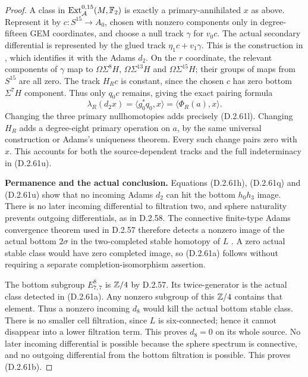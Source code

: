 \begin{proof}
A class in $\operatorname{Ext}^{0,15}_{\mathcal A}(M,\mathbb F_2)$
is exactly a primary-annihilated $x$ as above.
Represent it by $c:S^{15}\to A_0$, chosen with nonzero
components only in degree-fifteen GEM coordinates, and
choose a null track $\gamma$ for $v_0c$.
The actual secondary differential is represented by
the glued track $\eta_1c+v_1\gamma$.
This is the construction in
\cite[equation~(4.1), Theorem~4.2, and Theorem~7.3 with
its proof, pp.~13--15 and 19--21]{EH5BauesJibladze2004},
which identifies it with the Adams $d_2$.
On the $r$ coordinate, the relevant components of
$\gamma$ map to
$\Omega\Sigma^8H$, $\Omega\Sigma^{13}H$ and
$\Omega\Sigma^{15}H$; their groups of maps from
$S^{15}$ are all zero.  The track $H_Rc$ is constant,
since the chosen $c$ has zero bottom $\Sigma^7H$
component.  Thus only $q_0c$ remains, giving the exact
pairing formula
\[
       \lambda_R(d_2x)
          =\langle g_0^*q_0,x\rangle
          =\langle\Phi_R(a),x\rangle.
       \tag{D.2.61u}
\]
Changing the three primary nullhomotopies adds precisely
\textup{(D.2.61l)}.  Changing $H_R$ adds a degree-eight
primary operation on $a$, by the same universal
construction or Adams's uniqueness theorem.
Every such change pairs zero with $x$.
This accounts for both the source-dependent tracks
and the full indeterminacy in \textup{(D.2.61u)}.

\medskip\noindent
\textbf{Permanence and the actual conclusion.}
Equations \textup{(D.2.61h)}, \textup{(D.2.61q)} and
\textup{(D.2.61u)} show that no incoming Adams $d_2$
can hit the bottom $h_0h_3$ image.
There is no later incoming differential to filtration
two, and sphere naturality prevents outgoing
differentials, as in D.2.58.
The connective finite-type Adams convergence theorem
used in D.2.57 therefore detects a nonzero image of the
actual bottom $2\sigma$ in the two-completed stable
homotopy of $L$
\cite[Part~III, Theorem~15.1 and its construction,
pp.~370--377]{EH5Adams1974AHSS}.
A zero actual stable class would have zero completed
image, so \textup{(D.2.61a)} follows without requiring
a separate completion-isomorphism assertion.

The bottom subgroup $E^8_{7,7}$ is $\mathbb Z/4$ by D.2.57.
Its twice-generator is the actual class detected in
\textup{(D.2.61a)}.  Any nonzero subgroup of this
$\mathbb Z/4$ contains that element.  Thus a nonzero incoming
$d_8$ would kill the actual bottom stable class.
There is no smaller cell filtration, since $L$ is
six-connected; hence it cannot disappear into a lower
filtration term.  This proves $d_8=0$ on its whole
source.  No later incoming differential is possible
because the sphere spectrum is connective, and no
outgoing differential from the bottom filtration is
possible.  This proves \textup{(D.2.61b)}.


\end{proof}
